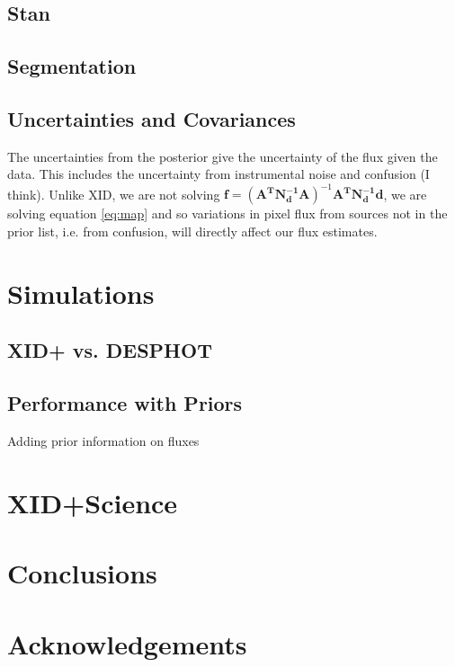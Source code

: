 \documentclass[useAMS,usenatbib]{mn2e}
\begin{document}

\subsection{Stan}
\subsection{Segmentation}
\subsection{Uncertainties and Covariances}
The uncertainties from the posterior give the uncertainty of the flux given the data. This includes the uncertainty from instrumental noise and confusion (I think). Unlike XID, we are not solving $\mathbf{f}=(\mathbf{A^TN_d^{-1}A})^{-1}\mathbf{A^TN_d^{-1}d}$, we are solving equation \ref{eq:map} and so variations in pixel flux from sources not in the prior list, i.e. from confusion, will directly affect our flux estimates.
\section{Simulations}
\subsection{XID+ vs. DESPHOT}
\subsection{Performance with Priors}
Adding prior information on fluxes 
\section{XID+Science}
\section{Conclusions}



\section*{Acknowledgements} %
%
%
%


%
%
%
%
%
%
%
\end{document}
